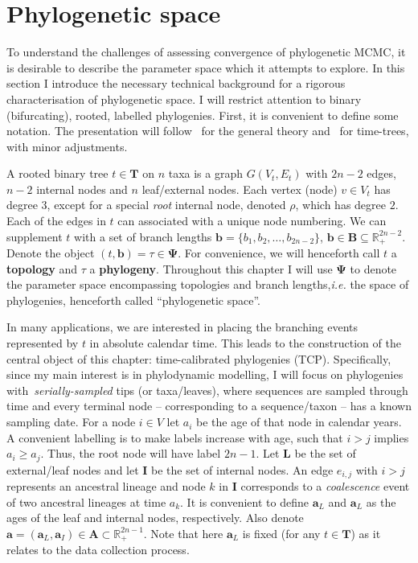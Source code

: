 \chapter{Phylogenetic space}
To understand the challenges of assessing convergence of phylogenetic MCMC, it is desirable to describe the parameter space which it attempts to explore.
In this section I introduce the necessary technical background for a rigorous characterisation of phylogenetic space.
I will restrict attention to binary (bifurcating), rooted, labelled phylogenies.
First, it is convenient to define some notation.
The presentation will follow~\cite{Semple2003} for the general theory and~\cite{Drummond2002} for time-trees, with minor adjustments.

A rooted binary tree $t \in \boldsymbol T$ on $n$ taxa is a graph $G(V_t, E_t)$ with $2n-2$ edges, $n-2$ internal nodes and $n$ leaf/external nodes.
Each vertex (node) $v \in V_t$ has degree $3$, except for a special \textit{root} internal node, denoted $\rho$, which has degree $2$.
Each of the edges in $t$ can associated with a unique node numbering.
We can supplement $t$ with a set of branch lengths $\boldsymbol b = \{b_1, b_2, \ldots, b_{2n-2} \}$, $\boldsymbol b \in \boldsymbol B \subseteq \mathbb{R}_{+}^{2n-2}$.
Denote the object $(t, \boldsymbol b) = \tau \in \boldsymbol\Psi$.
For convenience, we will henceforth call $t$ a \textbf{topology} and $\tau$ a \textbf{phylogeny}.
Throughout this chapter I will use $\boldsymbol\Psi$ to denote the parameter space encompassing topologies and branch lengths,\textit{i.e.} the space of phylogenies, henceforth called ``phylogenetic space''.

In many applications, we are interested in placing the branching events represented by $t$ in absolute calendar time.
This leads to the construction of the central object of this chapter: time-calibrated phylogenies (TCP).
Specifically, since my main interest is in phylodynamic modelling, I will focus on phylogenies with~\textit{serially-sampled} tips (or taxa/leaves), where sequences are sampled through time and every terminal node -- corresponding to a sequence/taxon -- has a known sampling date.
For a node $i \in V$ let $a_i$ be the age of that node in calendar years.
A convenient labelling is to make labels increase with age, such that $i > j$ implies $a_i \geq a_j$.
Thus, the root node will have label $2n-1$.
Let $\boldsymbol L$ be the set of external/leaf nodes and let $\boldsymbol I$ be the set of internal nodes.
An edge $e_{i,j}$ with $i > j$ represents an ancestral lineage and node $k$ in $\boldsymbol I$ corresponds to a \textit{coalescence} event of two ancestral lineages at time $a_k$.
It is convenient to define $\boldsymbol a_L$ and $\boldsymbol a_L$ as the ages of the leaf and internal nodes, respectively.
Also denote $\boldsymbol a  = (\boldsymbol a_L , \boldsymbol a_I) \in \boldsymbol A \subset \mathbb{R}_+^{2n-1}$.
Note that here $\boldsymbol a_L$ is fixed (for any $t \in  \boldsymbol T$) as it relates to the data collection process. 

